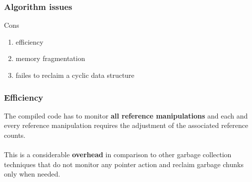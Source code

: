 \documentclass[presentation]{beamer}
\begin{document}
\begin{frame}
  \frametitle{Algorithm issues} 
  \justifying
  \begin{alertblock}{Cons}
  	\begin{enumerate}
		\item efficiency
		\item memory fragmentation
		\item failes to reclaim a cyclic data structure 	
  	\end{enumerate}
  \end{alertblock}
\end{frame}


\begin{frame}
  \frametitle{Efficiency} 
  \justifying
The compiled code has
to monitor \textbf{all reference manipulations} and each and every reference manipulation
requires the adjustment of the associated reference counts. 
\\~\\
This is a considerable
\textbf{overhead} in comparison to other garbage collection techniques that do not monitor
any pointer action and reclaim garbage chunks only when needed.
\end{frame}
\end{document}
